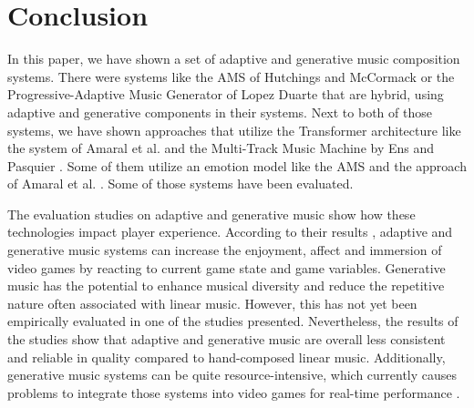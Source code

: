 \section{Conclusion}

In this paper, we have shown a set of adaptive and generative
music composition systems. There were systems like the AMS of Hutchings and McCormack
\cite{hutMcCormAms} or the Progressive-Adaptive Music Generator
of Lopez Duarte \cite{lopez2023progressive} that are hybrid, using 
adaptive and generative components in their systems. Next to both of those systems, we have shown approaches that utilize the Transformer architecture like the system of Amaral et al.
\cite{amaral2022adaptive} and the Multi-Track Music Machine by 
Ens and Pasquier \cite{ens2020mmm}. Some of them utilize an
emotion model like the AMS \cite{hutMcCormAms} and the approach
of Amaral et al. \cite{amaral2022adaptive}. Some of those
systems have been evaluated.

The evaluation studies on adaptive and generative music show how these technologies impact player experience. According to their results \cite{hutMcCormAms} \cite{plut2019music} \cite{plut2022preglam}, adaptive and generative music systems can increase the enjoyment, affect and immersion of video games by reacting to current game state and game variables. Generative music has the potential to enhance musical diversity and reduce the repetitive nature often associated with linear music. However, this has not yet been empirically evaluated in one of the studies presented.
Nevertheless, the results of the studies show that adaptive and generative music are overall less consistent and reliable in quality compared to hand-composed linear music. Additionally, generative music systems can be quite resource-intensive, which currently causes problems to integrate those systems into video games for real-time performance \cite{plut2022preglam}.
